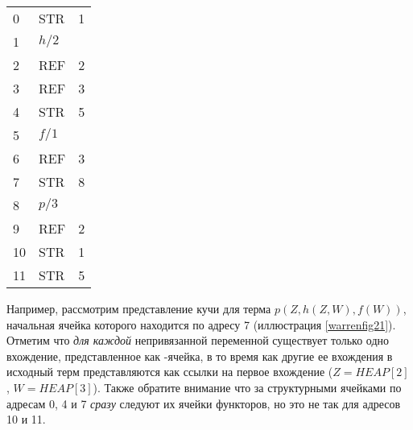 \label{warrenfig21}

\begin{tabular}{l l l}
0 & STR & 1 \\
1 & $h/2$ \\
2 & REF & 2\\
3 & REF & 3\\
4 & STR & 5\\
5 & $f/1$\\
6 & REF & 3\\
7 & STR & 8\\
8 & $p/3$\\
9 & REF & 2\\
10 & STR & 1\\
11 & STR & 5\\
\end{tabular}

\bigskip
Например, рассмотрим представление кучи для терма $p(Z,h(Z,W),f(W))$, начальная
ячейка которого находится по адресу 7 (иллюстрация \ref{warrenfig21}).
Отметим что \emph{для каждой} непривязанной переменной существует только одно
вхождение, представленное как -ячейка, в то время как другие ее
вхождения в исходный терм представляются как ссылки на первое вхождение
($Z=HEAP[2]$, $W=HEAP[3]$). Также обратите внимание что за структурными ячейками
по адресам 0, 4 и 7 \emph{сразу} следуют их ячейки функторов, но это не так для
адресов 10 и 11.

